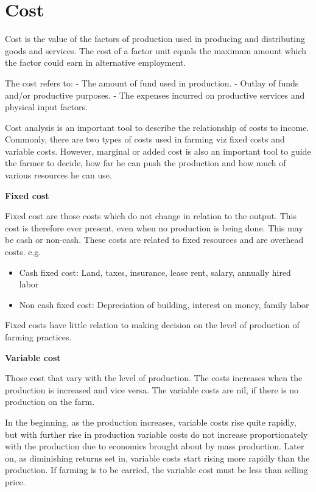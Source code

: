 \documentclass[11pt,]{book}
\providecommand{\tightlist}{%
  \setlength{\itemsep}{0pt}\setlength{\parskip}{0pt}}
\theoremstyle{definition}
\theoremstyle{definition}
\theoremstyle{definition}
\theoremstyle{remark}
\begin{document}
\section{Cost}\label{cost}

Cost is the value of the factors of production used in producing and
distributing goods and services. The cost of a factor unit equals the
maximum amount which the factor could earn in alternative employment.

The cost refers to: - The amount of fund used in production. - Outlay of
funds and/or productive purposes. - The expenses incurred on productive
services and physical input factors.

Cost analysis is an important tool to describe the relationship of costs
to income. Commonly, there are two types of costs used in farming viz
fixed costs and variable costs. However, marginal or added cost is also
an important tool to guide the farmer to decide, how far he can push the
production and how much of various resources he can use.

\textbf{Fixed cost}

Fixed cost are those costs which do not change in relation to the
output. This cost is therefore ever present, even when no production is
being done. This may be cash or non-cash. These costs are related to
fixed resources and are overhead costs. e.g.

\begin{itemize}
\tightlist
\item
  Cash fixed cost: Land, taxes, insurance, lease rent, salary, annually
  hired labor
\item
  Non cash fixed cost: Depreciation of building, interest on money,
  family labor
\end{itemize}

Fixed costs have little relation to making decision on the level of
production of farming practices.

\textbf{Variable cost}

Those cost that vary with the level of production. The costs increases
when the production is increased and vice versa. The variable costs are
nil, if there is no production on the farm.

In the beginning, as the production increases, variable costs rise quite
rapidly, but with further rise in production variable costs do not
increase proportionately with the production due to economics brought
about by mass production. Later on, as diminishing returns set in,
variable costs start rising more rapidly than the production. If farming
is to be carried, the variable cost must be less than selling price.
\end{document}

